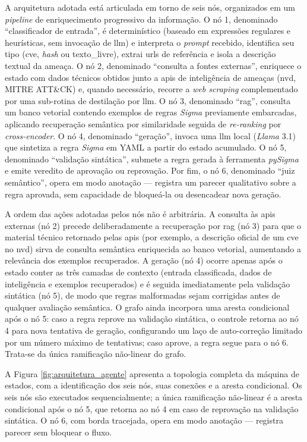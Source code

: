 A arquitetura adotada está articulada em torno de seis nós, organizados em um \textit{pipeline} de enriquecimento progressivo da informação. 
O nó 1, denominado “classificador de entrada”, é determinístico (baseado em expressões regulares e heurísticas, sem invocação de \gls{llm}) e interpreta o \textit{prompt} recebido, identifica seu tipo (\gls{cve}, \textit{hash} ou texto\_livre), extrai \gls{url}s de referência e isola a descrição textual da ameaça. 
O nó 2, denominado “consulta a fontes externas”, enriquece o estado com dados técnicos obtidos junto a \acrshort{api}s de inteligência de ameaças (\gls{nvd}, MITRE ATT\&CK) e, quando necessário, recorre a \textit{web scraping} complementado por uma sub-rotina de destilação por \gls{llm}. 
O nó 3, denominado “\gls{rag}”, consulta um banco vetorial contendo exemplos de regras \textit{Sigma} previamente embarcadas, aplicando recuperação semântica por similaridade seguida de \textit{re-ranking} por \textit{cross-encoder}. 
O nó 4, denominado “geração”, invoca uma \gls{llm} local (\textit{Llama} 3.1) que sintetiza a regra \textit{Sigma} em YAML a partir do estado acumulado. 
O nó 5, denominado “validação sintática”, submete a regra gerada à ferramenta \textit{pySigma} e emite veredito de aprovação ou reprovação. 
Por fim, o nó 6, denominado “juiz semântico”, opera em modo anotação --- registra um parecer qualitativo sobre a regra aprovada, sem capacidade de bloqueá-la ou desencadear nova geração.

A ordem das ações adotadas pelos nós não é arbitrária. 
A consulta às \acrshort{api}s externas (nó 2) precede deliberadamente a recuperação por \gls{rag} (nó 3) para que o material técnico retornado pelas \acrshort{api}s (por exemplo, a descrição oficial de um \gls{cve} no \gls{nvd}) sirva de consulta semântica enriquecida ao banco vetorial, aumentando a relevância dos exemplos recuperados.
A geração (nó 4) ocorre apenas após o estado conter as três camadas de contexto (entrada classificada, dados de inteligência e exemplos recuperados) e é seguida imediatamente pela validação sintática (nó 5), de modo que regras malformadas sejam corrigidas antes de qualquer avaliação semântica.
O grafo ainda incorpora uma aresta condicional após o nó 5: caso a regra reprove na validação sintática, o controle retorna ao nó 4 para nova tentativa de geração, configurando um laço de auto-correção limitado por um número máximo de tentativas;
caso aprove, a regra segue para o nó 6. 
Trata-se da única ramificação não-linear do grafo.

A Figura \ref{fig:arquitetura_agente} apresenta a topologia completa da máquina de estados, com a identificação dos seis nós, suas conexões e a aresta condicional. Os seis nós são executados sequencialmente; a única ramificação não-linear é a aresta condicional após o nó 5, que retorna ao nó 4 em caso de reprovação na validação sintática. O nó 6, com borda tracejada, opera em modo anotação --- registra parecer sem bloquear o fluxo.

